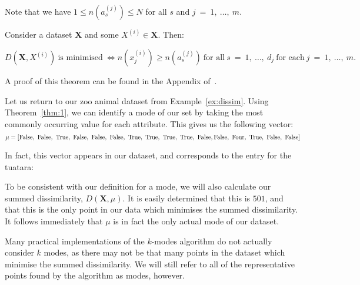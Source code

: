 \begin{remark}
    Note that we have \(1 \le n(a_s^{(j)}) \le N\) for all \(s\) and
    \(j~=~1,~\ldots,~m\).\\
\end{remark}

\begin{theorem}\label{thm:1}
    Consider a dataset \textbf{X} and some \(X^{(i)} \in \textbf{X}\). Then:
	
    \[
	    D(\textbf{X}, X^{(i)}) \ \text{is minimised} \ \iff n(x_j^{(i)}) \geq 
	    n(a_s^{(j)}) \ \text{for all} \ s~=~1,~\ldots,~d_j \ \text{for each} \
        j~=~1,~\ldots,~m. 
	\]
\end{theorem}
A proof of this theorem can be found in the Appendix of~\cite{Huang98}.\\

\begin{example}\label{ex:mode}
    Let us return to our zoo animal dataset from Example~\ref{ex:dissim}. Using 
    Theorem~\ref{thm:1}, we can identify a mode of our set by taking the most 
    commonly occurring value for each attribute. This gives us the following 
    vector:
    \[
        \mu = \left[\false, \ \false, \ \true, \ \false, \ \false, \ \false, \
        \true, \ \true, \ \true, \ \true, \ \false, \false, \ \text{Four}, \ 
        \true, \ \false, \ \false\right]
    \]

    In fact, this vector appears in our dataset, and corresponds to the entry 
    for the tuatara:
    
    \begin{table}[h]
        \resizebox{\textwidth}{!}{%
        \centering
        \label{tab:tuatara}
    }
    \end{table}

    To be consistent with our definition for a mode, we will also calculate our 
    summed dissimilarity, \(D(\textbf{X}, \mu)\). It is easily determined that
    this is \(501\), and that this is the only point in our data which minimises
    the summed dissimilarity. It follows immediately that \(\mu\) is in fact the
    only actual mode of our dataset.
\end{example}

\begin{remark}
    Many practical implementations of the \(k\)-modes algorithm do not actually
    consider \(k\) modes, as there may not be that many points in the dataset
    which minimise the summed dissimilarity. We will still refer to all of the 
    representative points found by the algorithm as modes, however.
\end{remark}

